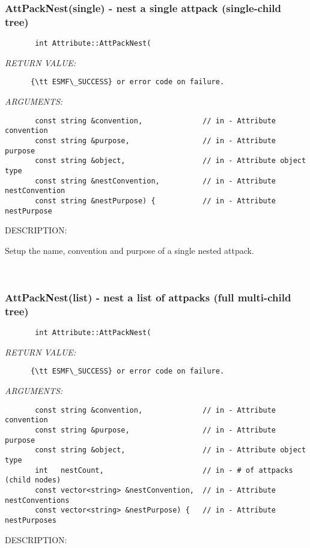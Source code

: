 \subsubsection [AttPackNest(single)] {AttPackNest(single) - nest a single attpack (single-child tree)}


  
\begin{verbatim}       int Attribute::AttPackNest(\end{verbatim}{\em RETURN VALUE:}
\begin{verbatim}      {\tt ESMF\_SUCCESS} or error code on failure.
   \end{verbatim}{\em ARGUMENTS:}
\begin{verbatim}       const string &convention,              // in - Attribute convention
       const string &purpose,                 // in - Attribute purpose
       const string &object,                  // in - Attribute object type
       const string &nestConvention,          // in - Attribute nestConvention
       const string &nestPurpose) {           // in - Attribute nestPurpose
   \end{verbatim}
{\sf DESCRIPTION:\\ }


       Setup the name, convention and purpose of a single nested attpack.
   
 
\mbox{}\hrulefill\
 
\subsubsection [AttPackNest(list)] {AttPackNest(list) - nest a list of attpacks (full multi-child tree)}


  
\begin{verbatim}       int Attribute::AttPackNest(\end{verbatim}{\em RETURN VALUE:}
\begin{verbatim}      {\tt ESMF\_SUCCESS} or error code on failure.
   \end{verbatim}{\em ARGUMENTS:}
\begin{verbatim}       const string &convention,              // in - Attribute convention
       const string &purpose,                 // in - Attribute purpose
       const string &object,                  // in - Attribute object type
       int   nestCount,                       // in - # of attpacks (child nodes)
       const vector<string> &nestConvention,  // in - Attribute nestConventions
       const vector<string> &nestPurpose) {   // in - Attribute nestPurposes
   \end{verbatim}
{\sf DESCRIPTION:\\ }


